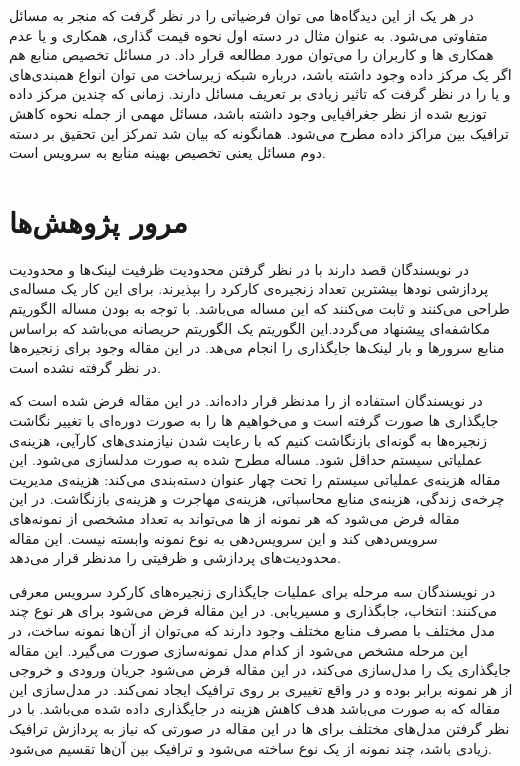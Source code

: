 در هر یک از این دیدگاه‌ها می توان فرضیاتی را در نظر گرفت که منجر به مسائل متفاوتی می‌شود.
به عنوان مثال در دسته اول نحوه قیمت گذاری، همکاری و یا عدم همکاری ‌ها و کاربران را می‌توان مورد مطالعه قرار داد.
در مسائل تخصیص منابع هم اگر یک مرکز داده وجود داشته باشد،
درباره شبکه زیرساخت می توان انواع همبندی‌های  و یا  را در نظر گرفت
که تاثیر زیادی بر تعریف مسائل دارند.
زمانی که چندین مرکز داده توزیع شده از نظر جغرافیایی وجود داشته باشد،
مسائل مهمی از جمله نحوه کاهش ترافیک بین مراکز داده مطرح می‌شود.
همانگونه که بیان شد تمرکز این تحقیق بر دسته دوم مسائل یعنی تخصیص بهینه منابع به سرویس است.

\section{مرور پژوهش‌ها}

در \cite{Eramo2016}
نویسندگان قصد دارند با در نظر گرفتن محدودیت ظرفیت لینک‌ها و محدودیت پردازشی نودها
بیشترین تعداد زنجیره‌ی کارکرد را بپذیرند. برای این کار یک مساله‌ی 
طراحی می‌کنند و ثابت می‌کنند که این مساله  می‌باشد.
با توجه به 
بودن مساله الگوریتم مکاشفه‌ای 
پیشنهاد می‌گردد.این الگوریتم یک الگوریتم حریصانه می‌باشد که براساس
منابع سرورها و بار لینک‌ها جایگذاری را انجام می‌هد.
در این مقاله وجود  برای زنجیره‌ها در نظر گرفته نشده است.

در \cite{AbuLebdeh2017}
نویسندگان استفاده از  را مدنظر قرار داده‌اند.
 در این مقاله فرض شده است که جایگذاری ها صورت گرفته است
و می‌خواهیم ها را به صورت دوره‌ای با تغییر نگاشت زنجیره‌ها به گونه‌ای بازنگاشت کنیم
که با رعایت شدن نیازمندی‌های کارآیی، هزینه‌ی عملیاتی سیستم حداقل شود.
مساله مطرح شده به صورت  مدلسازی می‌شود.
این مقاله هزینه‌ی عملیاتی سیستم را تحت چهار عنوان دسته‌بندی می‌کند:
هزینه‌ی مدیریت چرخه‌ی زندگی، هزینه‌ی منابع محاسباتی، هزینه‌ی مهاجرت و هزینه‌ی بازنگاشت.
در این مقاله فرض می‌شود که هر نمونه از ها می‌تواند به تعداد مشخصی از نمونه‌های 
سرویس‌دهی کند و این سرویس‌دهی به نوع نمونه وابسته نیست.
این مقاله محدودیت‌های پردازشی و ظرفیتی را مدنظر قرار می‌دهد.

در \cite{Ghaznavi2017}
نویسندگان سه مرحله برای عملیات جایگذاری زنجیره‌های کارکرد سرویس معرفی می‌کنند:
انتخاب،
جابگذاری و
مسیریابی.
در این مقاله فرض می‌شود برای هر نوع 
چند مدل مختلف با مصرف منابع مختلف وجود دارند که می‌توان از آن‌ها نمونه ساخت، در این مرحله مشخص می‌شود
از کدام مدل نمونه‌سازی صورت می‌گیرد.
این مقاله جایگذاری یک  را مدل‌سازی می‌کند،
در این مقاله فرض می‌شود جریان ورودی و خروجی از هر نمونه برابر بوده و در واقع
 تغییری بر روی ترافیک ایجاد نمی‌کند.
در مدل‌سازی این مقاله که به صورت  می‌باشد هدف کاهش هزینه در جایگذاری  داده شده می‌باشد.
با در نظر گرفتن مدل‌های مختلف برای ها در این مقاله
در صورتی که نیاز به پردازش ترافیک زیادی باشد، چند نمونه از یک نوع 
ساخته می‌شود و ترافیک بین آن‌ها تقسیم می‌شود.

